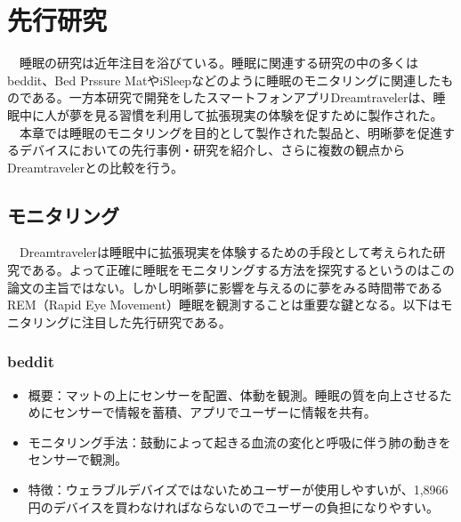 \chapter{先行研究}
\label{chap:search}

　睡眠の研究は近年注目を浴びている。睡眠に関連する研究の中の多くはbeddit\cite{beddit}、Bed Prssure MatやiSleep\cite{iSleep}などのように睡眠のモニタリングに関連したものである。一方本研究で開発をしたスマートフォンアプリDreamtravelerは、睡眠中に人が夢を見る習慣を利用して拡張現実の体験を促すために製作された。\\
　本章では睡眠のモニタリングを目的として製作された製品と、明晰夢を促進するデバイスにおいての先行事例・研究を紹介し、さらに複数の観点からDreamtravelerとの比較を行う。

\section{モニタリング}
　Dreamtravelerは睡眠中に拡張現実を体験するための手段として考えられた研究である。よって正確に睡眠をモニタリングする方法を探究するというのはこの論文の主旨ではない。しかし明晰夢に影響を与えるのに夢をみる時間帯であるREM（Rapid Eye Movement）睡眠を観測することは重要な鍵となる。以下はモニタリングに注目した先行研究である。

\subsection{beddit}
\begin{itemize}
\item 概要：マットの上にセンサーを配置、体動を観測。睡眠の質を向上させるためにセンサーで情報を蓄積、アプリでユーザーに情報を共有。
\item モニタリング手法：鼓動によって起きる血流の変化と呼吸に伴う肺の動きをセンサーで観測。\cite{beddit}
\item 特徴：ウェラブルデバイズではないためユーザーが使用しやすいが、1,8966円のデバイスを買わなければならないのでユーザーの負担になりやすい。
\end{itemize}

